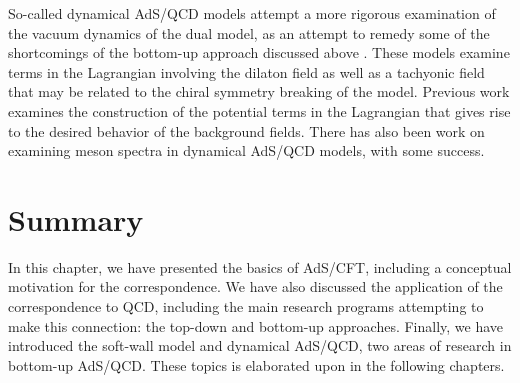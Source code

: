 So-called dynamical AdS/QCD models attempt a more rigorous examination of the vacuum dynamics of the dual model, as an attempt to remedy some of the shortcomings of the bottom-up approach discussed above \cite{Batell2008,Li:2013xpa,Li2013,DePaula2009,DePaula2010,Wang2012,Li2013a}. 
These models examine terms in the Lagrangian involving the dilaton field as well as a tachyonic field that may be related to the chiral symmetry breaking of the model.
Previous work examines the construction of the potential terms in the Lagrangian that gives rise to the desired behavior of the background fields.
There has also been work on examining meson spectra in dynamical AdS/QCD models, with some success.

\section{Summary}
In this chapter, we have presented the basics of AdS/CFT, including a conceptual motivation for the correspondence.
We have also discussed the application of the correspondence to QCD, including the main research programs attempting to make this connection: the top-down and bottom-up approaches. 
Finally, we have introduced the soft-wall model and dynamical AdS/QCD, two areas of research in bottom-up AdS/QCD. 
These topics is elaborated upon in the following chapters.

